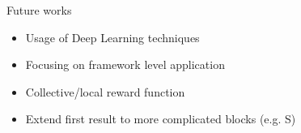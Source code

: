 \begin{frame}{\playfairblack Future works}
  \begin{card}
    \begin{itemize}  
      \item Usage of Deep Learning techniques
      \item Focusing on framework level application
      \item Collective/local reward function
      \item Extend first result to more complicated blocks (e.g. S)
    \end{itemize}
  \end{card}
\end{frame}